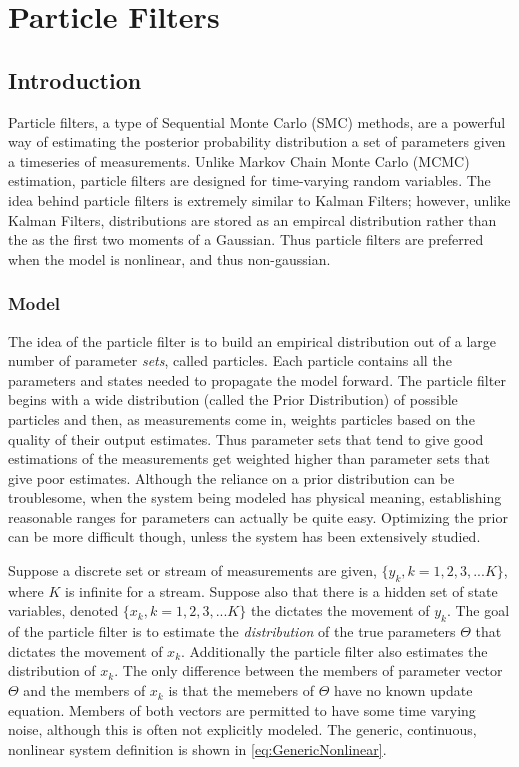 \chapter{Particle Filters}
\label{sec:Particle Filter}
\section{Introduction}
Particle filters, a type of Sequential Monte Carlo (SMC) methods,
are a powerful way of estimating the posterior probability distribution
a set of parameters given a timeseries of measurements. Unlike Markov 
Chain Monte Carlo (MCMC) estimation, particle filters are designed for 
time-varying random variables. The idea behind particle filters is
extremely similar to Kalman Filters; however, unlike Kalman Filters,
distributions are stored as an empircal distribution rather than the
as the first two moments of a Gaussian. Thus particle filters are 
preferred when the model is nonlinear, and thus non-gaussian.

\subsection{Model}
\label{sec:Particle Filter Model}
The idea of the particle filter is to build an empirical distribution
out of a large number of parameter \emph{sets}, called particles. Each
particle contains all the parameters and states needed to propagate
the model forward.  The particle filter begins with a wide distribution 
(called the Prior Distribution)
of possible particles and then, as measurements come in, weights 
particles based on the quality of their output estimates. Thus parameter sets 
that tend to give good estimations of the measurements get weighted higher
than parameter sets that give poor estimates. Although the reliance on
a prior distribution can be troublesome, when the system being modeled
has physical meaning, establishing reasonable ranges for parameters can 
actually be quite easy. Optimizing the prior can be more difficult though,
unless the system has been extensively studied.

Suppose a discrete set or stream of measurements are given, 
$\{y_k, k = 1, 2, 3, ... K\}$, where $K$ is infinite for a stream. 
Suppose also that there is a hidden set of state variables,
denoted $\{x_k, k = 1, 2, 3, ... K\}$ the dictates the movement
of $y_k$. The goal of the particle filter is to estimate the 
\emph{distribution} of the
true parameters $\Theta$ that dictates the movement of $x_k$. Additionally
the particle filter also estimates the distribution of $x_k$.
The only difference between the members of parameter vector
$\Theta$ and the members of $x_k$ is that the memebers of
$\Theta$ have no known update equation. Members of both vectors
are permitted to have some time varying noise, although this
is often not explicitly modeled. The generic, continuous, nonlinear
system definition is shown in \autoref{eq:GenericNonlinear}.

